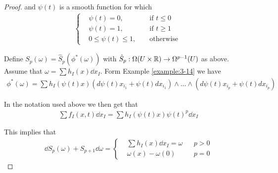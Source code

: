 \begin{proof}
and $\psi(t)$ is a smooth function for which 
\begin{align}
  \left\{\begin{aligned}
    & \psi(t) = 0, && \text{ if } t\le 0 \\
    & \psi(t) = 1, && \text{ if } t\ge 1 \\
    & 0\le\psi(t)\le 1, && \text{ otherwise }
  \end{aligned}\right.
\end{align}

Define $S_p(\omega) = \hat{S}_p(\phi^*(\omega))$ with $\hat{S}_p:\Omega(U\times{\ensuremath{\mathbb{R}}})\to\Omega^{p-1}(U)$ as above. Assume 
that $\omega = \sum h_I(x)\dd x_I$. Form Example \ref{example:3-14} we have 
\begin{align*}
  \phi^{*}(\omega)
  = \sum h_{I}(\psi(t)x)(d\psi(t)x_{i_{1}}+\psi(t)dx_{i_{1}})
    \wedge\ldots\wedge\left(d\psi(t)x_{i_{p}}+\psi(t)dx_{i_{p}}\right)  
\end{align*}

In the notation used above we then get that 
\begin{align*}
  \sum f_I(x, t)\dd x_I = \sum h_I(\psi(t)x)\psi(t)^p\dd x_I
\end{align*}

This implies that 
\begin{align*}
  \dd S_p(\omega) + S_{p+1}\dd\omega
  = \left\{\begin{aligned}
    & \sum h_I(x)\dd x_I = \omega &&  p > 0 \\
    & \omega(x) - \omega(0) &&  p = 0
  \end{aligned}\right.
\end{align*}
\end{proof}
